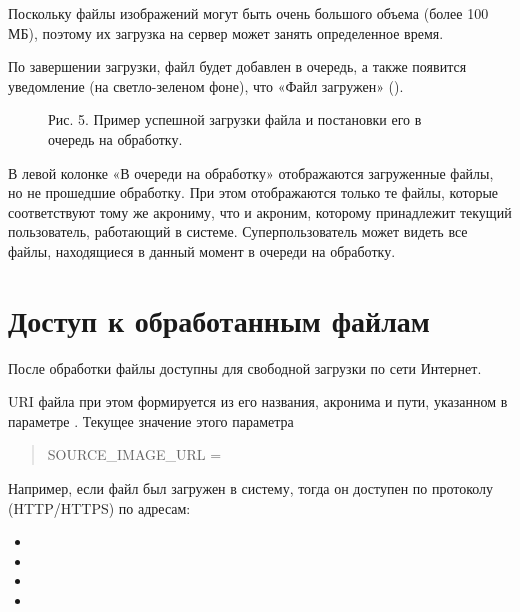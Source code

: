 \documentclass[letterpaper,10pt,russian]{sphinxmanual}
\begin{document}
Поскольку файлы изображений могут быть очень большого объема (более 100 МБ),
поэтому их загрузка на сервер может занять определенное время.

По завершении загрузки, файл будет добавлен в очередь,
а также появится уведомление (на светло-зеленом фоне), что
«Файл загружен» ({\hyperref[\detokenize{scanning:pic5}]{}}).

\begin{figure}[htbp]
\centering
\capstart

\noindent{}
\caption{Рис. 5. Пример успешной загрузки файла и постановки его в очередь на обработку.}\label{\detokenize{scanning:pic5}}\label{\detokenize{scanning:id15}}\end{figure}

В левой колонке «В очереди на обработку» отображаются загруженные файлы, но не прошедшие обработку.
При этом отображаются только те файлы, которые соответствуют тому же акрониму, что и акроним, которому
принадлежит текущий пользователь, работающий в системе. Суперпользователь может видеть все файлы,
находящиеся в данный момент в очереди на обработку.


\section{Доступ к обработанным файлам}
\label{\detokenize{scanning:id6}}
После обработки файлы доступны для свободной загрузки
по сети Интернет.

URI файла при этом формируется из его названия, акронима и пути, указанном в
параметре . Текущее значение этого параметра
\begin{quote}

SOURCE\_IMAGE\_URL = 
\end{quote}

Например, если файл  был загружен в систему, тогда он доступен
по протоколу (HTTP/HTTPS) по адресам:
\begin{itemize}
\item {} 

\item {} 

\item {} 

\item {} 

\end{itemize}
\end{document}

